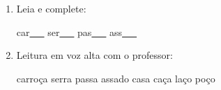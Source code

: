 \begin{exercicio}
\begin{enumerate}[resume]
\begin{enumerate}[label=(\alph*)]
    \item O som da unidade é: ( ) oral ( ) nasal ( ) vibrante

    \item A primeira sílaba de CARROÇA é: ( ) RRA ( ) CASA

    \item As palavras da unidade aparecem: ( ) no início ( ) no meio ( ) no fim das palavras

  \end{enumerate}

  \item Leia e complete:
  \begin{center}
  car\underline{~~~} \quad ser\underline{~~~} \quad pas\underline{~~~} \quad ass\underline{~~~}
  \end{center}

  \item Leitura em voz alta com o professor:
  \begin{center}
  carroça \quad serra \quad passa \quad assado \quad casa \quad caça \quad laço \quad poço
  \end{center}

\end{enumerate}

\end{exercicio}



